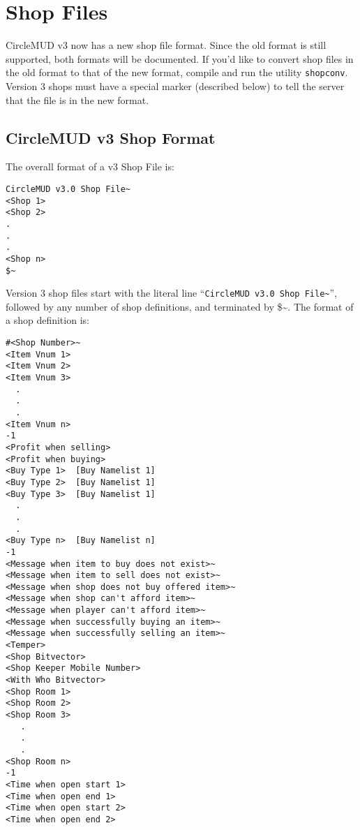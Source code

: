 \documentclass[11pt]{article}
\begin{document}
\section{Shop Files}
CircleMUD v3 now has a new shop file format.  Since the old format is still supported, both formats will be documented.  If you'd like to convert shop files in the old format to that of the new format, compile and run the utility \texttt{shopconv}.  Version 3 shops must have a special marker (described below) to tell the server that the file is in the new format.

\subsection{CircleMUD v3 Shop Format}
The overall format of a v3 Shop File is:
\begin{verbatim}
CircleMUD v3.0 Shop File~
<Shop 1>
<Shop 2>
.
.
.
<Shop n>
$~
\end{verbatim}
Version 3 shop files start with the literal line ``\texttt{CircleMUD v3.0 Shop File\~{}}'', followed by any number of shop definitions, and terminated by \$\~{}.  The format of a shop definition is:
\begin{verbatim}
#<Shop Number>~
<Item Vnum 1>
<Item Vnum 2>
<Item Vnum 3>
  .
  .
  .
<Item Vnum n>
-1
<Profit when selling>
<Profit when buying>
<Buy Type 1>  [Buy Namelist 1]
<Buy Type 2>  [Buy Namelist 1]
<Buy Type 3>  [Buy Namelist 1]
  .
  .
  .
<Buy Type n>  [Buy Namelist n]
-1
<Message when item to buy does not exist>~
<Message when item to sell does not exist>~
<Message when shop does not buy offered item>~
<Message when shop can't afford item>~
<Message when player can't afford item>~
<Message when successfully buying an item>~
<Message when successfully selling an item>~
<Temper>
<Shop Bitvector>
<Shop Keeper Mobile Number>
<With Who Bitvector>
<Shop Room 1>
<Shop Room 2>
<Shop Room 3>
   .
   .
   .
<Shop Room n>
-1
<Time when open start 1>
<Time when open end 1>
<Time when open start 2>
<Time when open end 2>
\end{verbatim}
\end{document}
